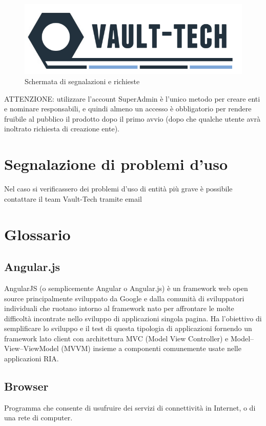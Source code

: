 \documentclass[a4paper, titlepage]{article}
\begin{document}
	\begin{figure}[!h]
		\centering
		\includegraphics[scale=0.5]{Img/logo.png}
		\caption{Schermata di segnalazioni e richieste}
	\end{figure}
	
	ATTENZIONE: utilizzare l'account SuperAdmin è l'unico metodo per creare enti e nominare responsabili, e quindi almeno un accesso è obbligatorio per rendere fruibile al pubblico il prodotto dopo il primo avvio (dopo che qualche utente avrà inoltrato richiesta di creazione ente).
	
	\section{Segnalazione di problemi d'uso}
	Nel caso si verificassero dei problemi d'uso di entità più grave è possibile contattare il team Vault-Tech tramite email 
	
	
	\newpage
	\appendix
	
	\section{Glossario}
	\label{gl} 
	
	\subsection{Angular.js}
	AngularJS (o semplicemente Angular o Angular.js) è un framework web open source principalmente sviluppato da Google e dalla comunità di sviluppatori individuali che ruotano intorno al framework nato per affrontare le molte difficoltà incontrate nello sviluppo di applicazioni singola pagina. Ha l'obiettivo di semplificare lo sviluppo e il test di questa tipologia di applicazioni fornendo un framework lato client con architettura MVC (Model View Controller) e Model–View–ViewModel (MVVM) insieme a componenti comunemente usate nelle applicazioni RIA.
	
	\subsection{Browser}
	Programma che consente di usufruire dei servizi di connettività in Internet, o di una rete di computer.
	
\end{document}
